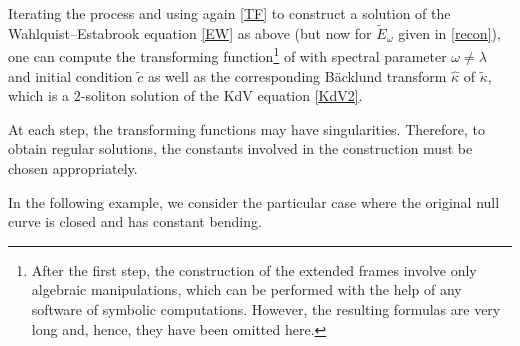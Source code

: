 \documentclass[10pt,a4paper]{amsart}
\numberwithin{equation}{section}
\def\bending{\kappa}
\begin{document}
Iterating the process and using again \eqref{TF} to construct a solution of the Wahlquist--Estabrook equation \eqref{EW} as above \big(but now for $\widetilde{E}_\omega$ given in \eqref{recon}\big), one can compute the transforming function\footnote{After the first step, the construction of the extended frames involve only algebraic manipulations, which can be performed with the help of any software of symbolic computations. However, the resulting formulas are very long and, hence, they have been omitted here.}  of \smash{$\widetilde{\bending}$}  with spectral parameter $\omega\neq \lambda$ and initial condition $\widetilde{c}$ as well as the corresponding B\"{a}cklund transform $\widehat{\bending}$ of $\widetilde{\bending}$, which is a $2$-soliton solution of the KdV equation \eqref{KdV2}.

\begin{Remark} At each step, the transforming functions may have singularities. Therefore, to obtain regular solutions, the constants involved in the construction must be chosen appropriately.
\end{Remark}

In the following example, we consider the particular case where the original null curve is closed and has constant bending.
\end{document}
